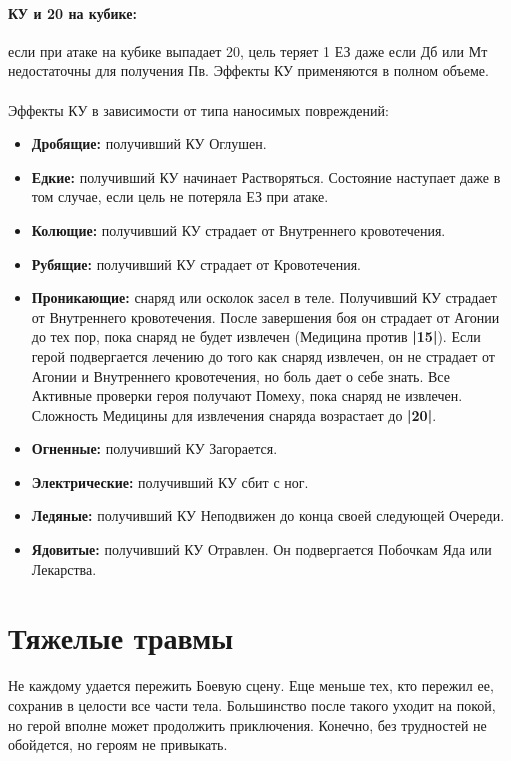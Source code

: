 \paragraph{КУ и 20 на кубике:} если при атаке на кубике выпадает 20, цель теряет 1 ЕЗ даже если Дб или Мт недостаточны для получения Пв. Эффекты КУ применяются в полном объеме.

\paragraph{}Эффекты КУ в зависимости от типа наносимых повреждений:
\begin{itemize}
  \item \textbf{Дробящие:} получивший КУ Оглушен.
  \item \textbf{Едкие:} получивший КУ начинает Растворяться. Состояние наступает даже в том случае, если цель не потеряла ЕЗ при атаке.
  \item \textbf{Колющие:} получивший КУ страдает от Внутреннего кровотечения.
  \item \textbf{Рубящие:} получивший КУ страдает от Кровотечения.
  \item \textbf{Проникающие:} снаряд или осколок засел в теле. Получивший КУ страдает от Внутреннего кровотечения. После завершения боя он страдает от Агонии до тех пор, пока снаряд не будет извлечен (Медицина против \textbf{|15|}). 
    \newline Если герой подвергается лечению до того как снаряд извлечен, он не страдает от Агонии и Внутреннего кровотечения, но боль дает о себе знать. Все Активные проверки героя получают Помеху, пока снаряд не извлечен. Сложность Медицины для извлечения снаряда возрастает до \textbf{|20|}. 
  \item \textbf{Огненные:} получивший КУ Загорается. 
  \item \textbf{Электрические:} получивший КУ сбит с ног.
  \item \textbf{Ледяные:} получивший КУ Неподвижен до конца своей следующей Очереди.
  \item \textbf{Ядовитые:} получивший КУ Отравлен. Он подвергается Побочкам Яда или Лекарства.
\end{itemize}





\section{Тяжелые травмы}
Не каждому удается пережить Боевую сцену. Еще меньше тех, кто пережил ее, сохранив в целости все части тела. Большинство после такого уходит на покой, но герой вполне может продолжить приключения. Конечно, без трудностей не обойдется, но героям не привыкать.
